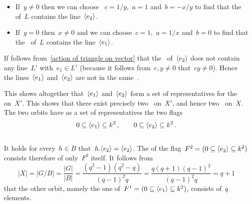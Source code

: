 \begin{itemize}
  \item
    If~$y \neq 0$ then we can choose ~$c = 1/y$,~$a = 1$ and~$b = -x/y$ to find that the~ of~$L$ contains the line~$\langle e_2\rangle$.
  \item
    If~$y = 0$ then~$x \neq 0$ and we can choose~$c = 1$,~$a = 1/x$ and~$b = 0$ to find that the~ of~$L$ contains the line~$\langle e_1\rangle$.
\end{itemize}
If follows from~\eqref{action of triangle on vector} that the~ of~$\langle e_2\rangle$ does not contain any line~$L'$ with~$e_1 \in L'$ (because it follows from~$c, y \neq 0$ that~$cy \neq 0$).
Hence the lines~$\langle e_1\rangle$ and~$\langle e_2\rangle$ are not in the same~.

This shows altogether that~$\langle e_1\rangle$ and~$\langle e_2\rangle$ form a set of representatives for the~ on~$X'$.
This shows that there exist precisely two~ on~$X'$, and hence two~ on~$X$.
The two orbits have as a set of representatives the two flags
\[
            0
  \subseteq \langle e_1\rangle
  \subseteq k^2 \,,
  \qquad
            0
  \subseteq \langle e_2\rangle
  \subseteq k^2 \,.
\]





\subsection{}

It holds for every~$h \in B$ that~$h.\langle e_2\rangle = \langle e_2\rangle$.
The  of the flag~$F^2 = (0 \subseteq \langle e_2\rangle \subseteq k^2)$ consists therefore of only~$F^2$ itself.
It follows from
\[
    |X|
  = |G/B|
  = \frac{|G|}{|B|}
  = \frac{(q^2 - 1)(q^2 - q)}{(q-1)^2 q}
  = \frac{q(q+1)(q-1)^2}{(q-1)^2 q}
  = q+1
\]
that the other orbit, namely the one of~$F^1 = (0 \subseteq \langle e_1\rangle \subseteq k^2)$, consists of~$q$ elements.





\subsection{}

